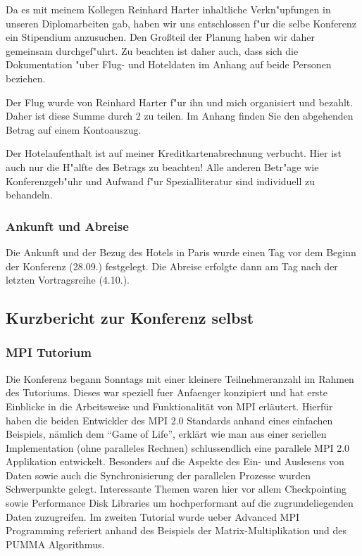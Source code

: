 \documentclass[a4paper,fleqn]{article}
\begin{document}
Da es mit meinem Kollegen Reinhard Harter inhaltliche Verkn"upfungen
in unseren Diplomarbeiten gab, haben wir uns entschlossen f"ur die
selbe Konferenz ein Stipendium anzusuchen. Den Gro\ss{}teil der Planung
haben wir daher gemeinsam durchgef"uhrt. Zu beachten ist daher auch,
dass sich die Dokumentation "uber Flug- und Hoteldaten im Anhang auf
beide Personen beziehen.

Der Flug wurde von Reinhard Harter f"ur ihn
und mich organisiert und bezahlt. Daher ist diese Summe durch 2 zu
teilen. Im Anhang finden Sie den abgehenden Betrag auf einem
Kontoauszug.

Der Hotelaufenthalt ist auf meiner Kreditkartenabrechnung
verbucht. Hier ist auch nur die H"alfte des Betrags zu beachten! Alle
anderen Betr"age wie Konferenzgeb"uhr und Aufwand f"ur
Spezialliteratur sind individuell zu behandeln.

\subsubsection{Ankunft und Abreise}

Die Ankunft und der Bezug des Hotels in Paris wurde einen Tag vor
dem Beginn der Konferenz (28.09.) festgelegt. Die Abreise erfolgte
dann am Tag nach der letzten Vortragsreihe (4.10.). 

\subsection{Kurzbericht zur Konferenz selbst}
\subsubsection{MPI Tutorium}
Die Konferenz begann Sonntags mit einer kleinere Teilnehmeranzahl im
Rahmen des Tutoriums. Dieses war speziell fuer Anfaenger konzipiert
und hat erste Einblicke in die Arbeitsweise und Funktionalität von MPI
erläutert. Hierfür haben die beiden Entwickler des MPI 2.0 Standards
anhand eines einfachen Beispiels, nämlich dem ``Game of Life'',
erklärt wie man aus einer seriellen Implementation (ohne paralleles
Rechnen) schlussendlich eine parallele MPI 2.0 Applikation
entwickelt. Besonders auf die Aspekte des Ein- und Auslesens von Daten
sowie auch die Synchronisierung der parallelen Prozesse wurden
Schwerpunkte gelegt. Interessante Themen waren hier vor allem
Checkpointing sowie Performance Disk Libraries um hochperformant auf
die zugrundeliegenden Daten zuzugreifen.
Im zweiten Tutorial wurde ueber Advanced MPI Programming referiert
anhand des Beispiels der Matrix-Multiplikation und des PUMMA
Algorithmus.
\end{document}
